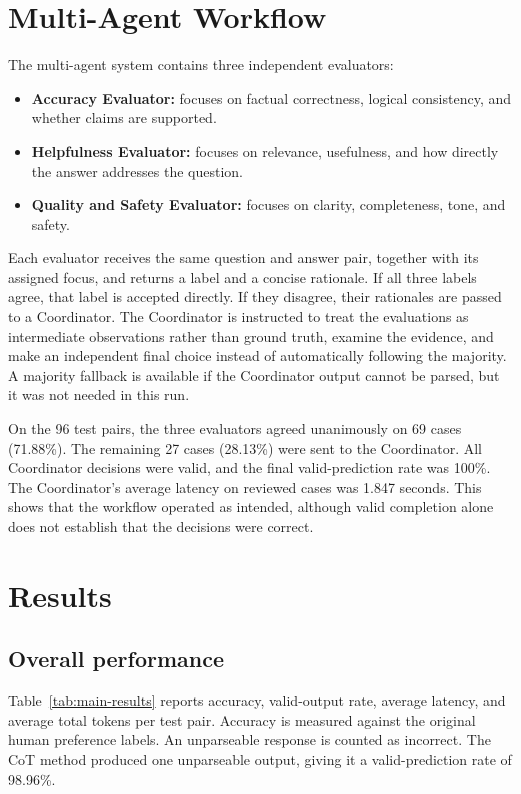 \documentclass[10pt]{article}
\begin{document}
\section{Multi-Agent Workflow}
The multi-agent system contains three independent evaluators:
\begin{itemize}
  \item \textbf{Accuracy Evaluator:} focuses on factual correctness, logical consistency, and whether claims are supported.
  \item \textbf{Helpfulness Evaluator:} focuses on relevance, usefulness, and how directly the answer addresses the question.
  \item \textbf{Quality and Safety Evaluator:} focuses on clarity, completeness, tone, and safety.
\end{itemize}

Each evaluator receives the same question and answer pair, together with its assigned focus, and returns a label and a concise rationale. If all three labels agree, that label is accepted directly. If they disagree, their rationales are passed to a Coordinator. The Coordinator is instructed to treat the evaluations as intermediate observations rather than ground truth, examine the evidence, and make an independent final choice instead of automatically following the majority. A majority fallback is available if the Coordinator output cannot be parsed, but it was not needed in this run.

On the 96 test pairs, the three evaluators agreed unanimously on 69 cases (71.88\%). The remaining 27 cases (28.13\%) were sent to the Coordinator. All Coordinator decisions were valid, and the final valid-prediction rate was 100\%. The Coordinator's average latency on reviewed cases was 1.847 seconds. This shows that the workflow operated as intended, although valid completion alone does not establish that the decisions were correct.

\section{Results}
\subsection{Overall performance}
Table~\ref{tab:main-results} reports accuracy, valid-output rate, average latency, and average total tokens per test pair. Accuracy is measured against the original human preference labels. An unparseable response is counted as incorrect. The CoT method produced one unparseable output, giving it a valid-prediction rate of 98.96\%.
\end{document}
